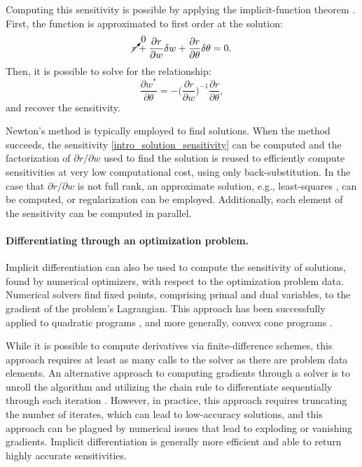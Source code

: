 Computing this sensitivity is possible by applying the implicit-function theorem \cite{dini1907lezioni}. First, the function is approximated to first order at the solution:
\begin{equation}
	\cancelto{0}{r} + \frac{\partial r}{\partial w} \delta w + \frac{\partial r}{\partial \theta} \delta \theta = 0.
\end{equation}
Then, it is possible to solve for the relationship: 
\begin{equation}
	\frac{\partial w^*}{\partial \theta} = -\Big(\frac{\partial r}{\partial w}\Big)^{-1} \frac{\partial r}{\partial \theta}, \label{intro_solution_sensitivity}
\end{equation}
and recover the sensitivity.

Newton's method is typically employed to find solutions. When the method succeeds, the sensitivity \eqref{intro_solution_sensitivity} can be computed and the factorization of $\partial r / \partial w$ used to find the solution is reused to efficiently compute sensitivities at very low computational cost, using only back-substitution. In the case that $\partial r / \partial w$ is not full rank, an approximate solution, e.g., least-squares \cite{boyd2004convex}, can be computed, or regularization can be employed. Additionally, each element of the sensitivity can be computed in parallel.

\paragraph{Differentiating through an optimization problem.}
Implicit differentiation can also be used to compute the sensitivity of solutions, found by numerical optimizers, with respect to the optimization problem data. Numerical solvers find fixed points, comprising primal and dual variables, to the gradient of the problem's Lagrangian. This approach has been successfully applied to quadratic programs \cite{amos2017optnet}, and more generally, convex cone programs \cite{agrawal2019differentiating}.

While it is possible to compute derivatives via finite-difference schemes, this approach requires at least as many calls to the solver as there are problem data elements. An alternative approach to computing gradients through a solver is to unroll the algorithm and utilizing the chain rule to differentiate sequentially through each iteration \cite{domke2012generic}. However, in practice, this approach requires truncating the number of iterates, which can lead to low-accuracy solutions, and this approach can be plagued by numerical issues that lead to exploding or vanishing gradients. Implicit differentiation is generally more efficient and able to return highly accurate sensitivities. 




